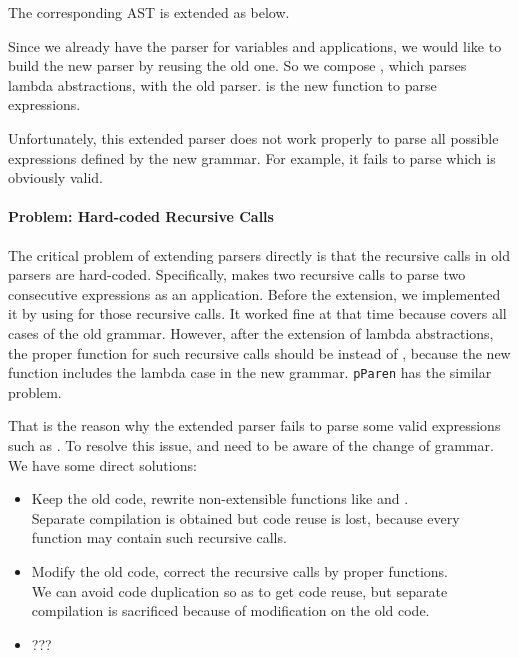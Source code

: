 The corresponding AST is extended as below.


Since we already have the parser for variables and applications, we would like to build the new parser by reusing the old one. So we compose , which parses lambda abstractions, with the old parser.  is the new function to parse expressions.


Unfortunately, this extended parser does not work properly to parse all possible expressions defined by the new grammar. For example, it fails to parse   which is obviously valid.

\paragraph{Problem: Hard-coded Recursive Calls} The critical problem of extending parsers directly is that the recursive calls in old parsers are hard-coded. Specifically,  makes two recursive calls to parse two consecutive expressions as an application. Before the extension, we implemented it by using  for those recursive calls. It worked fine at that time because  covers all cases of the old grammar. However, after the extension of lambda abstractions, the proper function for such recursive calls should be  instead of , because the new function  includes the lambda case in the new grammar. \lstinline{pParen} has the similar problem.

That is the reason why the extended parser fails to parse some valid expressions such as  . To resolve this issue,  and  need to be aware of the change of grammar. We have some direct solutions:

\begin{itemize}
    \item Keep the old code, rewrite non-extensible functions like  and . \\Separate compilation is obtained but code reuse is lost, because every function may contain such recursive calls.
    \item Modify the old code, correct the recursive calls by proper functions. \\We can avoid code duplication so as to get code reuse, but separate compilation is sacrificed because of modification on the old code.
    \item ??? 
\end{itemize}

